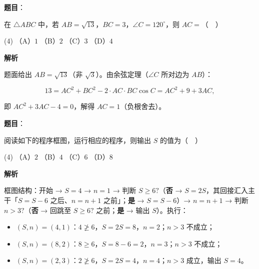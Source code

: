 \begin{answer}

\textbf{题目}：

在 \(\triangle ABC\) 中，若 \(AB=\sqrt{13}\)，\(BC=3\)，\(\angle C=120^{\circ}\)，则 \(AC=\)（　）

\begin{gkopts}(4)
\task （A）\(1\)
\task （B）\(2\)
\task （C）\(3\)
\task （D）\(4\)
\end{gkopts}

\Needspace{0.48\textheight}

\textbf{解析}

题面给出 \(AB=\sqrt{13}\)（非 \(\sqrt{3}\)）。由余弦定理（\(\angle C\) 所对边为 \(AB\)）：

\nopagebreak[4]
\[
13=AC^{2}+BC^{2}-2\cdot AC\cdot BC\cos C=AC^{2}+9+3AC,
\]

即 \(AC^{2}+3AC-4=0\)，解得 \(AC=1\)（负根舍去）。


\end{answer}
\begin{answer}

\textbf{题目}：

阅读如下的程序框图，运行相应的程序，则输出 \(S\) 的值为（　）
\nopagebreak[4]
\begin{center}\end{center}
\nopagebreak[4]
\begin{gkopts}(4)
\task （A）\(2\)
\task （B）\(4\)
\task （C）\(6\)
\task （D）\(8\)
\end{gkopts}

\textbf{解析}

框图结构：开始 → \(S=4\) → \(n=1\) → 判断 \(S\geqslant 6?\)（\textbf{否} → \(S=2S\)，其回接汇入主干「\(S=S-6\) 之后、\(n=n+1\) 之前」；\textbf{是} → \(S=S-6\)）→ \(n=n+1\) → 判断 \(n>3?\)（\textbf{否} → 回跳至 \(S\geqslant 6?\) 之前；\textbf{是} → 输出 \(S\)）。执行：

\begin{itemize}
\item \((S,n)=(4,1)\)：\(4\ngeqslant 6\)，\(S=2S=8\)，\(n=2\)；\(n>3\) 不成立；
\item \((S,n)=(8,2)\)：\(8\geqslant 6\)，\(S=8-6=2\)，\(n=3\)；\(n>3\) 不成立；
\item \((S,n)=(2,3)\)：\(2\ngeqslant 6\)，\(S=2S=4\)，\(n=4\)；\(n>3\) 成立，输出 \(S=4\)。
\end{itemize}


\end{answer}
